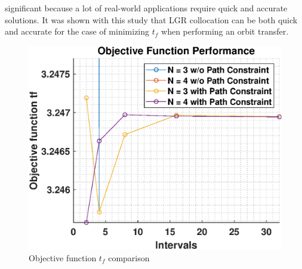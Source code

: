 \documentclass[]{article}
\begin{document}
significant because a lot of real-world applications require quick and accurate solutions. It was shown with this study that LGR collocation can be both quick and accurate for the case of minimizing \(t_f\) when performing an orbit transfer. 
	\begin{figure}
		\centering
		\includegraphics[scale=0.75]{minTfComparison.eps}
		\caption{Objective function \(t_f\) comparison}
		\label{fig:minTfComparison}
	\end{figure}
\end{document}
